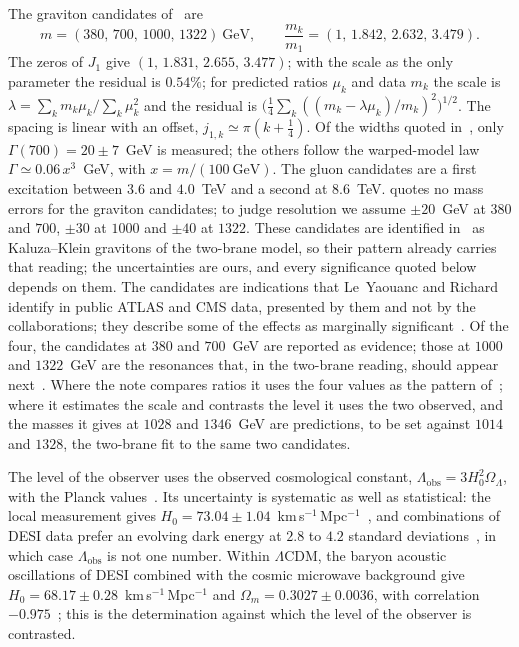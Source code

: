 \documentclass[11pt,reqno]{amsart}
\numberwithin{equation}{section}
\theoremstyle{remark}
\begin{document}
The graviton candidates of~\cite{LYR26} are
\begin{equation}\label{eq:data}
  m=(380,\,700,\,1000,\,1322)\ \mathrm{GeV},\qquad
  \frac{m_k}{m_1}=(1,\,1.842,\,2.632,\,3.479).
\end{equation}
The zeros of $J_1$ give $(1,\,1.831,\,2.655,\,3.477)$; with the scale as the only parameter the
residual is $0.54\%$; for predicted ratios $\mu_k$ and data $m_k$ the scale is $\lambda=\sum_k m_k\mu_k/\sum_k\mu_k^2$ and the residual is $\bigl(\tfrac14\sum_k((m_k-\lambda\mu_k)/m_k)^2\bigr)^{1/2}$. The spacing is linear with an offset,
$j_{1,k}\simeq\pi(k+\tfrac14)$. Of the widths quoted in~\cite{LYR26}, only
$\Gamma(700)=20\pm7$~GeV is measured; the others follow the warped-model law
$\Gamma\simeq0.06\,x^{3}$~GeV, with $x=m/(100\ \mathrm{GeV})$. The gluon candidates are a first excitation between $3.6$ and
$4.0$~TeV and a second at $8.6$~TeV. \cite{LYR26} quotes no mass errors for the graviton
candidates; to judge resolution we assume $\pm20$~GeV at $380$ and $700$, $\pm30$ at $1000$ and
$\pm40$ at $1322$. These candidates are identified in~\cite{LYR26} as Kaluza--Klein gravitons
of the two-brane model, so their pattern already carries that reading; the uncertainties are ours,
and every significance quoted below depends on them. The candidates are indications that Le~Yaouanc
and Richard identify in public ATLAS and CMS data, presented by them and not by the collaborations;
they describe some of the effects as marginally significant~\cite{LYR25,LYR26}. Of the four, the
candidates at $380$ and $700$~GeV are reported as evidence; those at $1000$ and $1322$~GeV are the
resonances that, in the two-brane reading, should appear next~\cite{LYR26b}. Where the note compares
ratios it uses the four values as the pattern of~\cite{LYR26}; where it estimates the scale and
contrasts the level it uses the two observed, and the masses it gives at $1028$ and $1346$~GeV are
predictions, to be set against $1014$ and $1328$, the two-brane fit to the same two candidates.

The level of the observer uses the observed cosmological constant,
$\Lambda_{\mathrm{obs}}=3H_0^2\Omega_\Lambda$, with the Planck values~\cite{Pla18}. Its uncertainty is
systematic as well as statistical: the local measurement gives $H_0=73.04\pm1.04$~km\,s$^{-1}$\,Mpc$^{-1}$~\cite{Rie22},
and combinations of DESI data prefer an evolving dark energy at $2.8$ to $4.2$ standard
deviations~\cite{DESI25}, in which case $\Lambda_{\mathrm{obs}}$ is not one number. Within $\Lambda$CDM, the
baryon acoustic oscillations of DESI combined with the cosmic microwave background give
$H_0=68.17\pm0.28$~km\,s$^{-1}$\,Mpc$^{-1}$ and $\Omega_m=0.3027\pm0.0036$, with correlation
$-0.975$~\cite{DESI25}; this is the determination against which the level of the observer is
contrasted.
\end{document}
